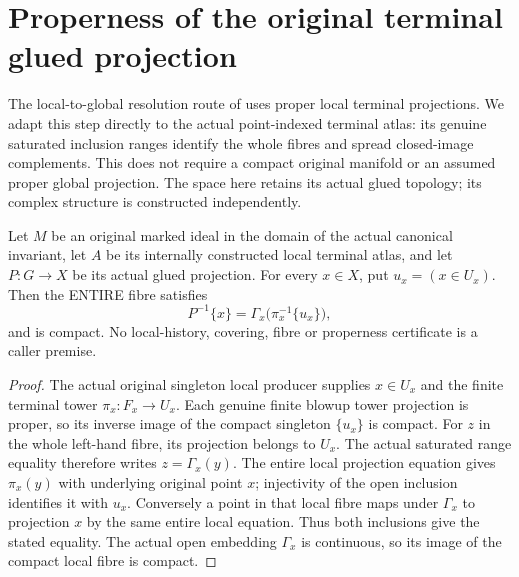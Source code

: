 \section{Properness of the original terminal glued projection}

The local-to-global resolution route of \cite{wlodarczyk05-hironaka}
uses proper local terminal projections. We adapt this step directly to the
actual point-indexed terminal atlas: its genuine saturated inclusion ranges
identify the whole fibres and spread closed-image complements. This does not
require a compact original manifold or an assumed proper global projection.
The space here retains its actual glued topology; its complex structure is
constructed independently.

\begin{lemma}
\label{hir:original-terminal-glued-whole-compact-fibres}
\leanok
{}
Let $M$ be an original marked ideal in the domain of the actual canonical
invariant, let $A$ be its internally constructed local terminal atlas, and
let $P:G\to X$ be its actual glued projection. For every $x\in X$, put
$u_x=(x\in U_x)$. Then the ENTIRE fibre satisfies
\[
 P^{-1}\{x\}=\Gamma_x\bigl(\pi_x^{-1}\{u_x\}\bigr),
\]
and is compact. No local-history, covering, fibre or properness certificate
is a caller premise.
\end{lemma}
\begin{proof}
The actual original singleton local producer supplies $x\in U_x$ and the
finite terminal tower $\pi_x:F_x\to U_x$. Each genuine finite blowup tower
projection is proper, so its inverse image of the compact singleton
$\{u_x\}$ is compact. For $z$ in the whole left-hand fibre, its projection
belongs to $U_x$. The actual saturated range equality therefore writes
$z=\Gamma_x(y)$. The entire local projection equation gives
$\pi_x(y)$ with underlying original point $x$; injectivity of the open
inclusion identifies it with $u_x$. Conversely a point in that local fibre
maps under $\Gamma_x$ to projection $x$ by the same entire local equation.
Thus both inclusions give the stated equality. The actual open embedding
$\Gamma_x$ is continuous, so its image of the compact local fibre is compact.
\end{proof}

